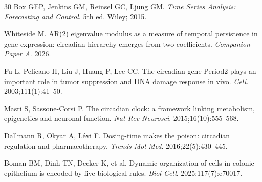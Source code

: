 \documentclass[11pt,letterpaper]{article}
\begin{document}
\begin{thebibliography}{30}
Box GEP, Jenkins GM, Reinsel GC, Ljung GM.
\textit{Time Series Analysis: Forecasting and Control}. 5th ed.
Wiley; 2015.

Whiteside M.
AR(2) eigenvalue modulus as a measure of temporal persistence in gene expression: circadian hierarchy emerges from two coefficients.
\textit{Companion Paper A}. 2026.

Fu L, Pelicano H, Liu J, Huang P, Lee CC.
The circadian gene Period2 plays an important role in tumor suppression and DNA damage response in vivo.
\textit{Cell}. 2003;111(1):41--50.

Masri S, Sassone-Corsi P.
The circadian clock: a framework linking metabolism, epigenetics and neuronal function.
\textit{Nat Rev Neurosci}. 2015;16(10):555--568.

Dallmann R, Okyar A, L\'{e}vi F.
Dosing-time makes the poison: circadian regulation and pharmacotherapy.
\textit{Trends Mol Med}. 2016;22(5):430--445.

Boman BM, Dinh TN, Decker K, et al.
Dynamic organization of cells in colonic epithelium is encoded by five biological rules.
\textit{Biol Cell}. 2025;117(7):e70017.

\end{thebibliography}
\end{document}
